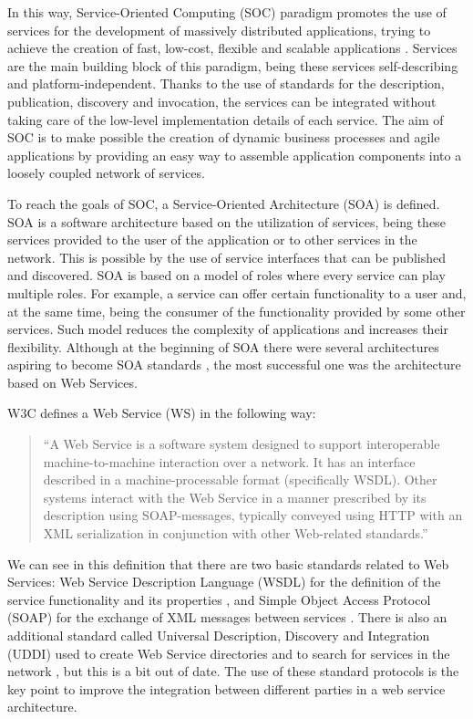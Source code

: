 In this way, Service-Oriented Computing (SOC) paradigm promotes the use of services 
for the development of massively distributed applications, trying to achieve the creation of fast, 
low-cost, flexible and scalable applications \cite{Papazoglou2007}. 
Services are the main building block of this paradigm, being these services self-describing and platform-independent. 
Thanks to the use of standards for the description, publication, discovery and invocation, 
the services can be integrated without taking care of the low-level implementation 
details of each service. The aim of SOC is to make possible 
the creation of dynamic business processes and agile applications 
by providing an easy way to assemble application components into a loosely coupled network of services.

To reach the goals of SOC, a Service-Oriented Architecture (SOA) is defined. 
SOA is a software architecture based on the utilization of services, 
being these services provided to the user of the application or to other services in the network. 
This is possible by the use of service interfaces that can be published and discovered. 
SOA is based on a model of roles where every service can play multiple roles. 
For example, a service can offer certain functionality to a user and, at the same time, 
being the consumer of the functionality provided by some other services. 
Such model reduces the complexity of applications and increases their flexibility. 
Although at the beginning of SOA there were several architectures aspiring 
to become SOA standards \cite{Karp2000,Sun1999}, the most successful one was the architecture based on Web Services.

W3C defines a Web Service (WS) in the following way:

\begin{quotation}
	``A Web Service is a software system designed to support interoperable machine-to-machine interaction over a network. It has
an interface described in a machine-processable format (specifically WSDL). Other systems interact with the Web Service in a manner prescribed by its description using SOAP-messages, typically conveyed using HTTP with an XML serialization in conjunction with other Web-related standards.''
\end{quotation}

We can see in this definition that there are two basic standards 
related to Web Services: Web Service Description Language (WSDL) for the definition 
of the service functionality and its properties \cite{W3C2001}, 
and Simple Object Access Protocol (SOAP) for the exchange of 
XML messages between services \cite{W3C2007}. 
There is also an additional standard called Universal Description, Discovery and Integration (UDDI) 
used to create Web Service directories and to search for services 
in the network \cite{OASIS2004}, but this is a bit out of date. The use of these standard protocols is 
the key point to improve the integration between different parties in a web service architecture.

